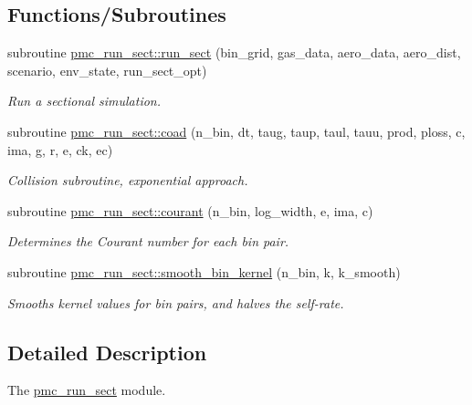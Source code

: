 \subsection*{Functions/\+Subroutines}
\begin{DoxyCompactItemize}
\item 
subroutine \mbox{\hyperlink{namespacepmc__run__sect_a98f7b8811139683010e8a70346452ac2}{pmc\+\_\+run\+\_\+sect\+::run\+\_\+sect}} (bin\+\_\+grid, gas\+\_\+data, aero\+\_\+data, aero\+\_\+dist, scenario, env\+\_\+state, run\+\_\+sect\+\_\+opt)
\begin{DoxyCompactList}\small\item\em Run a sectional simulation. \end{DoxyCompactList}\item 
subroutine \mbox{\hyperlink{namespacepmc__run__sect_ab0cefd419d24a8416f61f3d6a1098f0e}{pmc\+\_\+run\+\_\+sect\+::coad}} (n\+\_\+bin, dt, taug, taup, taul, tauu, prod, ploss, c, ima, g, r, e, ck, ec)
\begin{DoxyCompactList}\small\item\em Collision subroutine, exponential approach. \end{DoxyCompactList}\item 
subroutine \mbox{\hyperlink{namespacepmc__run__sect_a55df1799d03853355ca1d55274b370df}{pmc\+\_\+run\+\_\+sect\+::courant}} (n\+\_\+bin, log\+\_\+width, e, ima, c)
\begin{DoxyCompactList}\small\item\em Determines the Courant number for each bin pair. \end{DoxyCompactList}\item 
subroutine \mbox{\hyperlink{namespacepmc__run__sect_af8c0ab7ec5c461726865d56af791a77a}{pmc\+\_\+run\+\_\+sect\+::smooth\+\_\+bin\+\_\+kernel}} (n\+\_\+bin, k, k\+\_\+smooth)
\begin{DoxyCompactList}\small\item\em Smooths kernel values for bin pairs, and halves the self-\/rate. \end{DoxyCompactList}\end{DoxyCompactItemize}


\subsection{Detailed Description}
The \mbox{\hyperlink{namespacepmc__run__sect}{pmc\+\_\+run\+\_\+sect}} module. 

